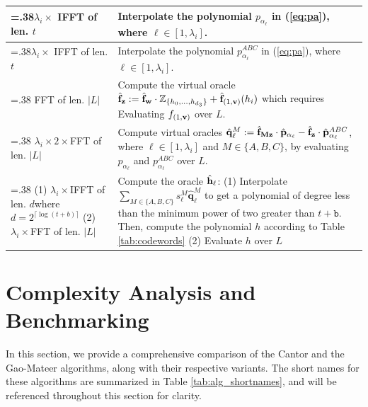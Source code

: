 \begin{table}
{\begin{tabularx}{\linewidth}{>{\hsize=.38\hsize}XX}
			\midrule
			$\lambda_i \times$ IFFT of len. $t$ & Interpolate the polynomial $p_{\alpha_\ell}$ in (\ref{eq:pa}), where $\ell \in [1,\lambda_i]$. 
			\\
			\midrule
			$\lambda_i \times$ IFFT of len. $t$ & Interpolate the polynomial $p^{ABC}_{\alpha_\ell}$ in (\ref{eq:pa}), where $\ell \in [1,\lambda_i]$. 
			\\
			\midrule
			FFT of len. $|L|$ & Compute the virtual oracle $\hat{{\bf{f}}}_{\bf{z}} := \hat{{\bf{f}}}_{\bf{w}} \cdot \mathbb{Z}_{\{h_0,\dots, h_{d_3}\}} + \hat{{\bf{f}}}_{(1,{\bf{v}})}(h_i)$ which requires 
			Evaluating $f_{(1,{\bf{v}})}$ over $L$.
			\\
			\midrule
			$\lambda_i \times 2 \times $FFT of len. $|L|$ & Compute virtual oracles $\hat{\mathbf{q}}_\ell^M := \hat{{\bf{f}}}_{\mathbf{Mz}}\cdot \hat{\mathbf{p}}_{\alpha_\ell} - \hat{{\bf{f}}}_{\bf{z}} \cdot \hat{\mathbf{p}}^{ABC}_{\alpha_\ell} $, where $\ell \in [1,\lambda_i]$ and $M \in \{A, B, C\}$, by evaluating $p_{\alpha_\ell}$ and $p^{ABC}_{\alpha_\ell}$ over $L$.
			\\
			\midrule
			(1) $\lambda_i \times $IFFT of len. $d$\newline where $d = 2^{\lceil\log(t+b)\rceil}$ \newline
			(2) $\lambda_i \times $FFT of len.
			$|L|$
			& Compute the oracle $\hat{{\bf{h}}}_\ell$:\newline
			(1) Interpolate $\sum_{M \in \{A, B, C\}} s^M_\ell \hat{\mathbf{q}}_\ell^M$ to get a  polynomial of degree less than the minimum power of two greater than $t + \texttt{b}$.%
			Then, compute the polynomial $h$ according to Table \ref{tab:codewords}\newline
			(2) Evaluate $h$ over $L$
			\\
			\bottomrule
		\end{tabularx}
	}
\end{table}




\section{Complexity Analysis and Benchmarking}\label{Sec:ComplexityAnalysis}
In this section, we provide a comprehensive comparison of the Cantor and the Gao-Mateer algorithms, along with their respective variants. The short names for these algorithms are summarized in Table \ref{tab:alg_shortnames}, and will be referenced throughout this section for clarity.  



